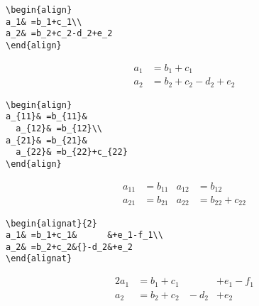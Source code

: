 \begin{table}[p]
\begin{makeimage}
\begin{minipage}{\textwidth}
\begin{eqxample}
\begin{verbatim}
\begin{align}
a_1& =b_1+c_1\\
a_2& =b_2+c_2-d_2+e_2
\end{align}
\end{verbatim}
\producing
\begin{align}
a_1& =b_1+c_1\\
a_2& =b_2+c_2-d_2+e_2
\end{align}
\end{eqxample}

\begin{eqxample}
\begin{verbatim}
\begin{align}
a_{11}& =b_{11}&
  a_{12}& =b_{12}\\
a_{21}& =b_{21}&
  a_{22}& =b_{22}+c_{22}
\end{align}
\end{verbatim}
\producing
\begin{align}
a_{11}& =b_{11}&
  a_{12}& =b_{12}\\
a_{21}& =b_{21}&
  a_{22}& =b_{22}+c_{22}
\end{align}
\end{eqxample}

\begin{eqxample}
\begin{verbatim}
\begin{alignat}{2}
a_1& =b_1+c_1&      &+e_1-f_1\\
a_2& =b_2+c_2&{}-d_2&+e_2
\end{alignat}
\end{verbatim}
\producing
\begin{alignat}{2}
a_1& =b_1+c_1&      &+e_1-f_1\\
a_2& =b_2+c_2&{}-d_2&+e_2
\end{alignat}
\end{eqxample}


\end{minipage}
\end{makeimage}
\end{table}
